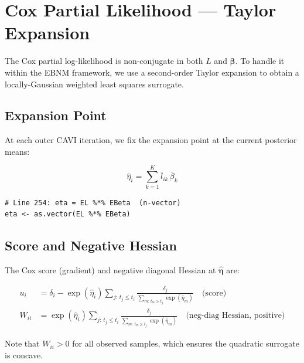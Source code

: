 \documentclass[11pt]{article}
\newcommand{\lbar}[2]{\bar{l}_{#1#2}}
\newcommand{\betabar}[1]{\bar{\beta}_{#1}}
\begin{document}
\section{Cox Partial Likelihood --- Taylor Expansion}\label{sec:taylor}

The Cox partial log-likelihood is non-conjugate in both $L$ and $\bm{\beta}$.
To handle it within the EBNM framework, we use a second-order Taylor
expansion to obtain a locally-Gaussian weighted least squares surrogate.

\subsection{Expansion Point}

At each outer CAVI iteration, we fix the expansion point at the current
posterior means:

\begin{equation}
  \hat{\eta}_i = \sum_{k=1}^K \lbar{i}{k}\,\betabar{k}
\end{equation}

\begin{codebox}
\begin{lstlisting}[style=Rstyle]
# Line 254: eta = EL %*% EBeta  (n-vector)
eta <- as.vector(EL %*% EBeta)
\end{lstlisting}
\end{codebox}

\subsection{Score and Negative Hessian}

The Cox score (gradient) and negative diagonal Hessian at $\hat{\bm{\eta}}$
are:

\begin{align}
  u_i &= \delta_i - \exp(\hat{\eta}_i)\sum_{j:\,t_j \le t_i}
          \frac{\delta_j}{\sum_{m:\,t_m \ge t_j}\exp(\hat{\eta}_m)}
  \quad \text{(score)} \label{eq:cox-score} \\[6pt]
  W_{ii} &= \exp(\hat{\eta}_i)\sum_{j:\,t_j \le t_i}
             \frac{\delta_j}{\sum_{m:\,t_m \ge t_j}\exp(\hat{\eta}_m)}
  \quad \text{(neg-diag Hessian, positive)} \label{eq:cox-hessian}
\end{align}

Note that $W_{ii} > 0$ for all observed samples, which ensures the quadratic
surrogate is concave.
\end{document}
